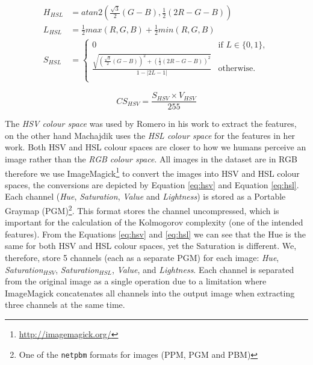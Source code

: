 \documentclass[11pt,a4paper,twoside,openright,draft]{report}
\begin{document}
\begin{multicols}{2}
\begin{figure}[!htb]
\begin{equation}
\begin{aligned}
H_{HSL}  &= atan2\left(\frac{\sqrt{3}}{2}(G-B), \frac{1}{2}(2R-G-B)\right) \\
L_{HSL}  &= \frac{1}{2}max(R,G,B) + \frac{1}{2}min(R,G,B) \\
S_{HSL}  &= \left\{
  \begin{array}{ll}
    0  &  \text{if } L \in \{0,1\}, \\
    \frac{\sqrt{ \left(\frac{\sqrt{3}}{2}(G-B)\right)^2
               + \left(\frac{1}{2}(2R-G-B)\right)^2 }}{1 - \lvert 2L-1 \rvert}
  &  \text{otherwise}. \\
  \end{array}
           \right.
\label{eq:hsl}
\end{aligned}
\end{equation}
\end{figure}

\begin{equation}
CS_{HSV} = \frac{S_{HSV} \times V_{HSV}}{255}
\label{eq:cs}
\end{equation}

The \emph{HSV colour space} was used by Romero \cite{jma12clas} in his work to
extract the features, on the other hand Machajdik \cite{mach10clas} uses the
\emph{HSL colour space} for the features in her work.  Both HSV and HSL colour
spaces are closer to how we humans perceive an image rather than the \emph{RGB
colour space}.  All images in the dataset are in RGB therefore we use
ImageMagick\footnote{ \href{http://imagemagick.org/}{http://imagemagick.org/} }
to convert the images into HSV and HSL colour spaces, the conversions are
depicted by Equation \ref{eq:hsv} and Equation \ref{eq:hsl}.  Each channel
(\emph{Hue}, \emph{Saturation}, \emph{Value} and \emph{Lightness}) is stored as
a Portable Graymap (PGM)\footnote{One of the \texttt{netpbm} formats for images
(PPM, PGM and PBM)}.  This format stores the channel uncompressed, which is
important for the calculation of the Kolmogorov complexity (one of the intended
features).  From the Equations \ref{eq:hsv} and \ref{eq:hsl} we can see that
the Hue is the same for both HSV and HSL colour spaces, yet the Saturation is
different.  We, therefore, store 5 channels (each as a separate PGM) for each
image: \emph{Hue}, \emph{Saturation$_{HSV}$}, \emph{Saturation$_{HSL}$},
\emph{Value}, and \emph{Lightness}.  Each channel is separated from the
original image as a single operation due to a limitation where ImageMagick
concatenates all channels into the output image when extracting three channels
at the same time.


\end{multicols}
\end{document}
